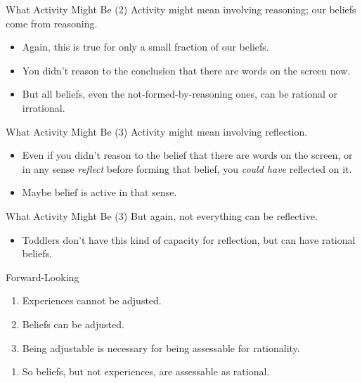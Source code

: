 \documentclass[
  17pt,
  letterpaper,
  ignorenonframetext,
  aspectratio=169,
  handout,
  xcolor={dvipsnames}]{beamer}
\providecommand{\tightlist}{%
  \setlength{\itemsep}{0pt}\setlength{\parskip}{0pt}}\usepackage{longtable,booktabs,array}
\begin{document}
\begin{frame}{What Activity Might Be (2)}
\protect\hypertarget{what-activity-might-be-2}{}
Activity might mean involving reasoning; our beliefs come from
reasoning.

\begin{itemize}[<+->]
\tightlist
\item
  Again, this is true for only a small fraction of our beliefs.
\item
  You didn't reason to the conclusion that there are words on the screen
  now.
\item
  But all beliefs, even the not-formed-by-reasoning ones, can be
  rational or irrational.
\end{itemize}
\end{frame}

\begin{frame}{What Activity Might Be (3)}
\protect\hypertarget{what-activity-might-be-3}{}
Activity might mean involving reflection.

\begin{itemize}[<+->]
\tightlist
\item
  Even if you didn't reason to the belief that there are words on the
  screen, or in any sense \emph{reflect} before forming that belief, you
  \emph{could have} reflected on it.
\item
  Maybe belief is active in that sense.
\end{itemize}
\end{frame}

\begin{frame}{What Activity Might Be (3)}
\protect\hypertarget{what-activity-might-be-3-1}{}
But again, not everything can be reflective.

\begin{itemize}[<+->]
\tightlist
\item
  Toddlers don't have this kind of capacity for reflection, but can have
  rational beliefs.
\end{itemize}
\end{frame}

\begin{frame}{Forward-Looking}
\protect\hypertarget{forward-looking}{}
\begin{enumerate}[<+->]
\tightlist
\item
  Experiences cannot be adjusted.
\item
  Beliefs can be adjusted.
\item
  Being adjustable is necessary for being assessable for rationality.
\end{enumerate}

\begin{enumerate}[<+->]
[A.]
\setcounter{enumi}{2}
\tightlist
\item
  So beliefs, but not experiences, are assessable as rational.
\end{enumerate}
\end{frame}
\end{document}
